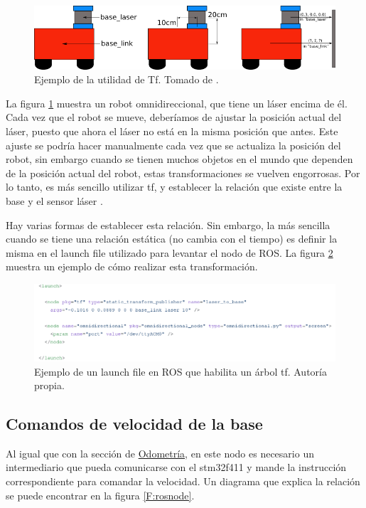 \begin{figure}[H]
\centering
\includegraphics[scale=0.6]{imagenes/simple_robot.png}
\caption{Ejemplo de la utilidad de Tf. Tomado de \cite{ROSTF}.}
\label{F:tf}
\end{figure}

La figura \ref{F:tf} muestra un robot omnidireccional, que tiene un láser encima de él. Cada vez que el robot se mueve, deberíamos de ajustar la posición actual del láser, puesto que ahora el láser no está en la misma posición que antes. Este ajuste se podría hacer manualmente cada vez que se actualiza la posición del robot, sin embargo cuando se tienen muchos objetos en el mundo que dependen de la posición actual del robot, estas transformaciones se vuelven engorrosas. Por lo tanto, es más sencillo utilizar tf, y establecer la relación que existe entre la base y el sensor láser \cite{ROSTF}.

Hay varias formas de establecer esta relación. Sin embargo, la más sencilla cuando se tiene una relación estática (no cambia con el tiempo) es definir la misma en el launch file utilizado para levantar el nodo de ROS. La figura \ref{F:launchfile} muestra un ejemplo de cómo realizar esta transformación.

\begin{figure}[H]
\centering
\includegraphics[scale=0.4]{imagenes/launch_file.png}
\caption{Ejemplo de un launch file en ROS que habilita un árbol tf. Autoría propia.}
\label{F:launchfile}
\end{figure}

\subsection{Comandos de velocidad de la base}

Al igual que con la sección de \hyperref[seccionodometria]{Odometría}, en este nodo es necesario un intermediario que pueda comunicarse con el stm32f411 y mande la instrucción correspondiente para comandar la velocidad. Un diagrama que explica la relación se puede encontrar en la figura \ref{F:rosnode}.

